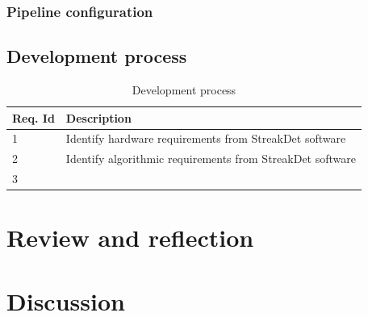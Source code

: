 \documentclass[12pt]{report}
\begin{document}
\subsection{Pipeline configuration}

\section{Development process}
\begin{table}[h]
    \begin{tabular}{|p{3cm}|p{10cm}|}
        \hline
        \textbf{Req. Id}& \textbf{Description}\\
        \hline
        1&Identify hardware requirements from StreakDet software\\
        \hline
        2&Identify algorithmic requirements from StreakDet software\\ 
        \hline
        3&\\
        \hline
    \end{tabular}
    \caption{Development process}
    \label{table:dev_process}
\end{table}

\chapter{Review and reflection}

\chapter{Discussion}




\end{document}
